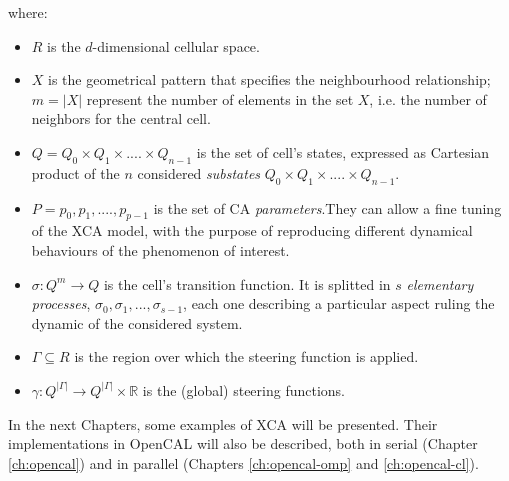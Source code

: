 \noindent where:

\begin{itemize}

\item $R$ is the $d$-dimensional cellular space.

\item $X$ is the geometrical pattern that specifies the neighbourhood
  relationship; $m = |X|$ represent the number of elements in the set
  $X$, i.e. the number of neighbors for the central cell.

\item $Q = Q_0 \times Q_1 \times....\times Q_{n-1}$ is the set of
  cell's states, expressed as Cartesian product of the $n$ considered
  \emph{substates} $Q_0 \times Q_1 \times....\times Q_{n-1}$.

\item $P = {p_0,p_1,....,p_{p-1}}$ is the set of CA
  \emph{parameters}.They can allow a fine tuning of the XCA model,
  with the purpose of reproducing different dynamical behaviours of
  the phenomenon of interest.

\item $\sigma : Q^m \rightarrow Q$ is the cell's transition function.
 It is splitted in $s$ \emph{elementary processes}, $\sigma_0,\sigma_1, ...,
  \sigma_{s-1}$, each one describing a particular aspect ruling the
  dynamic of the considered system.

\item $\Gamma \subseteq R$ is the region  over which the steering
  function is applied.

\item $\gamma: Q^{|\Gamma|} \rightarrow Q^{|\Gamma|} \times
  \mathbb{R}$ is the (global) steering functions.

\end{itemize}

In the next Chapters, some examples of XCA will be presented. Their
implementations in OpenCAL will also be described, both in serial
(Chapter \ref{ch:opencal}) and in parallel (Chapters
\ref{ch:opencal-omp} and \ref{ch:opencal-cl}).


